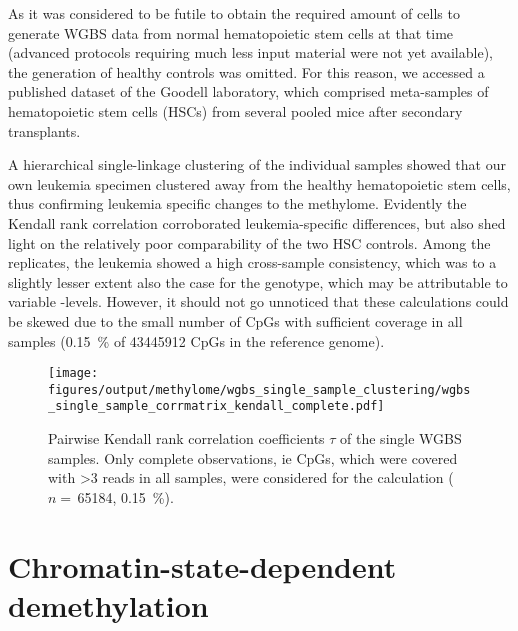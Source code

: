 As it was considered to be futile to obtain the required amount of cells to generate WGBS data from normal hematopoietic stem cells at that time (advanced protocols requiring much less input material were not yet available), the generation of healthy controls was omitted. For this reason, we accessed a published dataset of the Goodell laboratory, which comprised meta-samples of hematopoietic stem cells (HSCs) from several pooled mice after secondary transplants\cite{Jeong2014}.

A hierarchical single-linkage clustering of the individual samples 	 showed that our own leukemia specimen clustered away from the healthy hematopoietic stem cells, thus confirming leukemia specific changes to the methylome. Evidently the Kendall rank correlation corroborated leukemia-specific differences, but also shed light on the relatively poor comparability of the two HSC controls. Among the \mllafnine replicates, the \dnmtwt leukemia showed a high cross-sample consistency, which was to a slightly lesser extent also the case for the \dnmtchip genotype, which may be attributable to variable -levels. However, it should not go unnoticed that these calculations could be skewed due to the small number of CpGs with sufficient coverage in all samples (\SI{0.15}{\percent} of \num{43445912} CpGs in the \mmnine reference genome). 
\begin{figure}[!ht] 
	\centering
	\texttt{[image: figures/output/methylome/wgbs\_single\_sample\_clustering/wgbs\_single\_sample\_corrmatrix\_kendall\_complete.pdf]} 
	\caption [Correlation matrix for single WGBS samples]{Pairwise Kendall rank correlation coefficients \ensuremath{\tau} of the single WGBS samples. Only complete observations, ie CpGs, which were covered with >3 reads in all samples, were considered for the calculation (\ensuremath{n=\,}\num{65184}, \SI{0.15}{\percent}).}
	\label{fig:wgbs:single:sample:corplot}
\end{figure}

\setcounter{section}{2}
\section{Chromatin-state-dependent demethylation}
\label{chap:r:wgbs:lad_demethylation}

\setcounter{subsection}{2}
